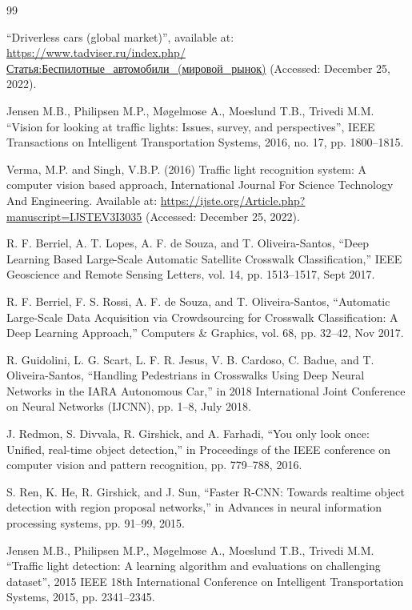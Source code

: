 \documentclass{misisarticle}
\begin{document}
\begin{thebibliography}{99}

 “Driverless cars (global market)”, available at: \url{https://www.tadviser.ru/index.php/Статья:Беспилотные\_автомобили\_(мировой\_рынок)} (Accessed: December 25, 2022).

 Jensen M.B., Philipsen M.P., Møgelmose A., Moeslund T.B., Trivedi M.M. “Vision for looking at traffic lights: Issues, survey, and perspectives”, IEEE Transactions on Intelligent Transportation Systems, 2016, no. 17, pp. 1800–1815.

 Verma, M.P. and Singh, V.B.P. (2016) Traffic light recognition system: A computer vision based approach, International Journal For Science Technology And Engineering. Available at: \url{https://ijste.org/Article.php?manuscript=IJSTEV3I3035} (Accessed: December 25, 2022).

 R. F. Berriel, A. T. Lopes, A. F. de Souza, and T. Oliveira-Santos, “Deep Learning Based Large-Scale Automatic Satellite Crosswalk Classification,” IEEE Geoscience and Remote Sensing Letters, vol. 14, pp. 1513–1517, Sept 2017.

 R. F. Berriel, F. S. Rossi, A. F. de Souza, and T. Oliveira-Santos, “Automatic Large-Scale Data Acquisition via Crowdsourcing for Crosswalk Classification: A Deep Learning Approach,” Computers \& Graphics, vol. 68, pp. 32–42, Nov 2017.

 R. Guidolini, L. G. Scart, L. F. R. Jesus, V. B. Cardoso, C. Badue, and T. Oliveira-Santos, “Handling Pedestrians in Crosswalks Using Deep Neural Networks in the IARA Autonomous Car,” in 2018 International Joint Conference on Neural Networks (IJCNN), pp. 1–8, July 2018.

 J. Redmon, S. Divvala, R. Girshick, and A. Farhadi, “You only look once: Unified, real-time object detection,” in Proceedings of the IEEE conference on computer vision and pattern recognition, pp. 779–788, 2016.

 S. Ren, K. He, R. Girshick, and J. Sun, “Faster R-CNN: Towards realtime object detection with region proposal networks,” in Advances in neural information processing systems, pp. 91–99, 2015.

 Jensen M.B., Philipsen M.P., Møgelmose A., Moeslund T.B., Trivedi M.M. “Traffic light detection: A learning algorithm and evaluations on challenging dataset”, 2015 IEEE 18th International Conference on Intelligent Transportation Systems, 2015, pp. 2341–2345.


\end{thebibliography}
\end{document}
